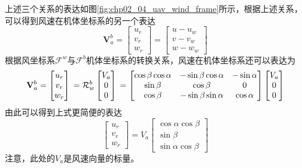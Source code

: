 上述三个关系的表达如图\ref{fig:chp02_04_uav_wind_frame}所示，根据上述关系，可以得到风速在机体坐标系的另一个表达
\begin{equation}
	\mathbf{V}_a^b  = \begin{bmatrix} u_r \\ v_r \\ w_r \end{bmatrix} =   \begin{bmatrix} u - u_w \\ v - v_w \\ w- w_w \end{bmatrix}
\end{equation}
根据风坐标系$\mathcal{F}^w$与$\mathcal{F}^b$机体坐标系的转换关系，风速在机体坐标系还可以表达为
\begin{equation}
	\mathbf{V}_a^b  = \begin{bmatrix} u_r \\ v_r \\ w_r \end{bmatrix} \\
	=  \mathcal{R}_w^b \begin{bmatrix} V_a \\ 0 \\ 0 \end{bmatrix} \\
	=  \begin{bmatrix}	\cos \beta \cos \alpha & - \sin \beta \cos \alpha  & - \sin \alpha      \\	 \sin \beta & \cos \beta   & 0 \\ 	\cos \beta   & -\sin \beta \sin \alpha & \cos \alpha \end{bmatrix} \begin{bmatrix} V_a \\ 0 \\ 0 \end{bmatrix}
\end{equation}
由此可以得到上式更简便的表达
\begin{equation}
	\begin{bmatrix} u_r \\ v_r \\ w_r \end{bmatrix}  = {V}_a \begin{bmatrix} \cos \alpha \cos \beta \\ \sin \beta  \\ \sin \alpha \cos \beta \end{bmatrix}
\end{equation}
注意，此处的$V_a$是风速向量的标量。

